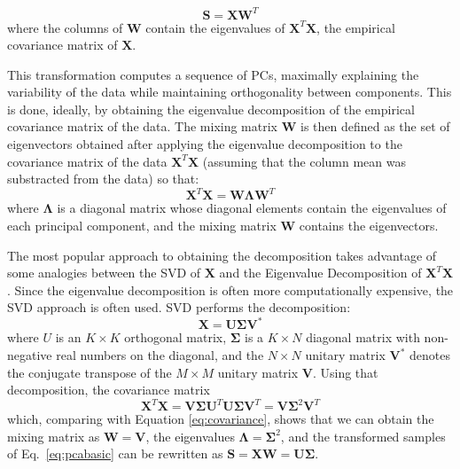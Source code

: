 \begin{equation}\label{eq:pcabasic}
	\mathbf{S}=\mathbf{X}\mathbf{W}^T
\end{equation}
where the columns of $\mathbf{W}$ contain the eigenvalues of $\mathbf{X}^T\mathbf{X}$, the empirical covariance matrix of $\mathbf{X}$. 

This transformation computes a sequence of PCs, maximally explaining the variability of the data while maintaining orthogonality between components. This is done, ideally, by obtaining the eigenvalue decomposition of the empirical covariance matrix of the data. The mixing matrix $\mathbf{W}$ is then defined as the set of eigenvectors obtained after applying the eigenvalue decomposition to the covariance matrix of the data $\mathbf{X}^T\mathbf{X}$ (assuming that the column mean was substracted from the data) so that: 
\begin{equation}\label{eq:covariance}
\mathbf{X}^T\mathbf{X} = \mathbf{W}\boldsymbol\Lambda\mathbf{W}^T
\end{equation}
where $\boldsymbol\Lambda$ is a diagonal matrix whose diagonal elements contain the eigenvalues of each principal component, and the mixing matrix $\mathbf{W}$ contains the eigenvectors. 

The most popular approach to obtaining the decomposition takes advantage of some analogies between the \ac{SVD} of $\mathbf{X}$ and the Eigenvalue Decomposition of $\mathbf{X}^T\mathbf{X}$. Since the eigenvalue decomposition is often more computationally expensive, the \ac{SVD} approach is often used. \ac{SVD} performs the decomposition:
\begin{equation}
\mathbf{X} = \mathbf{U} \boldsymbol{\Sigma} \mathbf{V}^* 
\end{equation}
where  $U$ is an $K\times K$ orthogonal matrix,  $\boldsymbol\Sigma$ is a $K\times N$ diagonal matrix with non-negative real numbers on the diagonal, and the $N\times N$ unitary matrix  $\mathbf{V}^*$ denotes the conjugate transpose of the $M\times M$ unitary matrix $\mathbf{V}$.
Using that decomposition, the covariance matrix 
\begin{equation}
\mathbf{X}^T\mathbf{X} = \mathbf{V}\boldsymbol\Sigma\mathbf{U}^T\mathbf{U}\boldsymbol\Sigma\mathbf{V}^T = \mathbf{V}\boldsymbol\Sigma^2\mathbf{V}^T
\end{equation}
which, comparing with Equation \ref{eq:covariance}, shows that we can obtain the mixing matrix as $\mathbf{W} = \mathbf{V}$, the eigenvalues $\boldsymbol\Lambda = \boldsymbol\Sigma^2$, and the transformed samples of Eq.~\ref{eq:pcabasic} can be rewritten as $\mathbf{S} = \mathbf{X}\mathbf{W} = \mathbf{U}\boldsymbol{\Sigma}$. 

